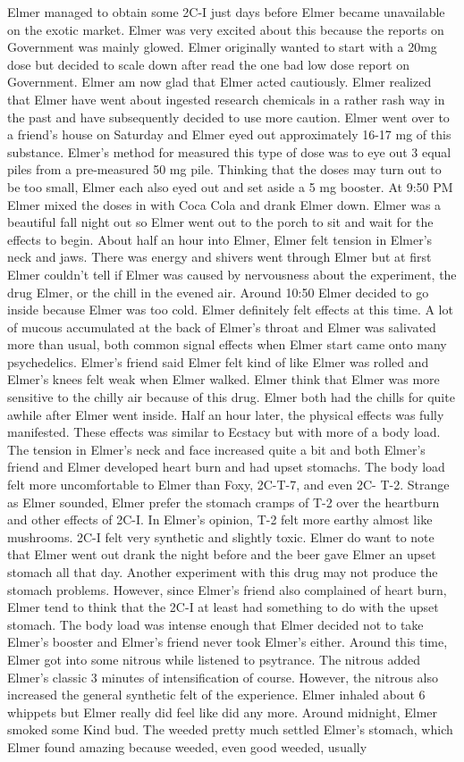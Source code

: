 \documentclass[12pt]{book}
\begin{document}
Elmer managed to obtain some 2C-I just days before Elmer became unavailable on the exotic market. Elmer was very excited about this because the reports on Government was mainly glowed. Elmer originally wanted to start with a 20mg dose but decided to scale down after read the one bad low dose report on Government. Elmer am now glad that Elmer acted cautiously. Elmer realized that Elmer have went about ingested research chemicals in a rather rash way in the past and have subsequently decided to use more caution. Elmer went over to a friend's house on Saturday and Elmer eyed out approximately 16-17 mg of this substance. Elmer's method for measured this type of dose was to eye out 3 equal piles from a pre-measured 50 mg pile. Thinking that the doses may turn out to be too small, Elmer each also eyed out and set aside a 5 mg booster. At 9:50 PM Elmer mixed the doses in with Coca Cola and drank Elmer down. Elmer was a beautiful fall night out so Elmer went out to the porch to sit and wait for the effects to begin. About half an hour into Elmer, Elmer felt tension in Elmer's neck and jaws. There was energy and shivers went through Elmer but at first Elmer couldn't tell if Elmer was caused by nervousness about the experiment, the drug Elmer, or the chill in the evened air. Around 10:50 Elmer decided to go inside because Elmer was too cold. Elmer definitely felt effects at this time. A lot of mucous accumulated at the back of Elmer's throat and Elmer was salivated more than usual, both common signal effects when Elmer start came onto many psychedelics. Elmer's friend said Elmer felt kind of like Elmer was rolled and Elmer's knees felt weak when Elmer walked. Elmer think that Elmer was more sensitive to the chilly air because of this drug. Elmer both had the chills for quite awhile after Elmer went inside. Half an hour later, the physical effects was fully manifested. These effects was similar to Ecstacy but with more of a body load. The tension in Elmer's neck and face increased quite a bit and both Elmer's friend and Elmer developed heart burn and had upset stomachs. The body load felt more uncomfortable to Elmer than Foxy, 2C-T-7, and even 2C- T-2. Strange as Elmer sounded, Elmer prefer the stomach cramps of T-2 over the heartburn and other effects of 2C-I. In Elmer's opinion, T-2 felt more earthy almost like mushrooms. 2C-I felt very synthetic and slightly toxic. Elmer do want to note that Elmer went out drank the night before and the beer gave Elmer an upset stomach all that day. Another experiment with this drug may not produce the stomach problems. However, since Elmer's friend also complained of heart burn, Elmer tend to think that the 2C-I at least had something to do with the upset stomach. The body load was intense enough that Elmer decided not to take Elmer's booster and Elmer's friend never took Elmer's either. Around this time, Elmer got into some nitrous while listened to psytrance. The nitrous added Elmer's classic 3 minutes of intensification of course. However, the nitrous also increased the general synthetic felt of the experience. Elmer inhaled about 6 whippets but Elmer really did feel like did any more. Around midnight, Elmer smoked some Kind bud. The weeded pretty much settled Elmer's stomach, which Elmer found amazing because weeded, even good weeded, usually 
\end{document}
